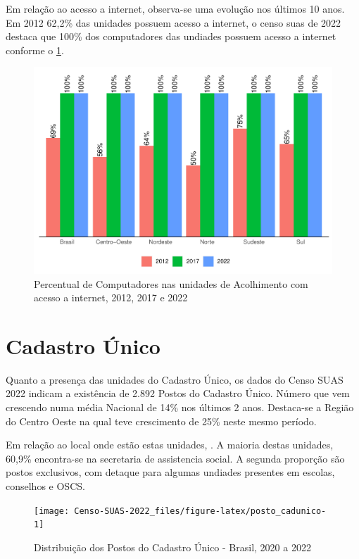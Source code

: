 \documentclass[
  brazilian]{report}
\begin{document}
Em relação ao acesso a internet, observa-se uma evolução nos últimos 10
anos. Em 2012 62,2\% das unidades possuem acesso a internet, o censo
suas de 2022 destaca que 100\% dos computadores das undiades possuem
acesso a internet conforme o \cref{fig:unac-internet}.

\begin{figure}
\includegraphics{Censo-SUAS-2022_files/figure-latex/unac-internet-1} \caption[Percentual de Computadores nas unidades de Acolhimento com acesso a internet, 2012, 2017 e 2022]{Percentual de Computadores nas unidades de Acolhimento com acesso a internet, 2012, 2017 e 2022}\label{fig:unac-internet}
\end{figure}

\hypertarget{cadastro-uxfanico}{%
\section{Cadastro Único}\label{cadastro-uxfanico}}

Quanto a presença das unidades do Cadastro Único, os dados do Censo SUAS
2022 indicam a existência de 2.892 Postos do Cadastro Único. Número que
vem crescendo numa média Nacional de 14\% nos últimos 2 anos. Destaca-se
a Região do Centro Oeste na qual teve crescimento de 25\% neste mesmo
período.

Em relação ao local onde estão estas unidades,
. A maioria destas unidades, 60,9\% encontra-se
na secretaria de assistencia social. A segunda proporção são postos
exclusivos, com detaque para algumas undiades presentes em escolas,
conselhos e OSCS.

\begin{figure}
\texttt{[image: Censo-SUAS-2022\_files/figure-latex/posto\_cadunico-1]} \caption[Distribuição dos Postos do Cadastro Único - Brasil, 2020 a 2022]{Distribuição dos Postos do Cadastro Único - Brasil, 2020 a 2022}\label{fig:posto_cadunico}
\end{figure}
\end{document}
